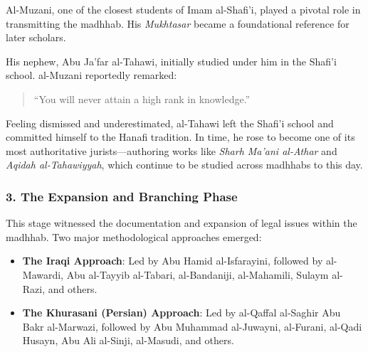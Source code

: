 \documentclass[
  a4paper,
  DIV=11,
  numbers=noendperiod]{scrartcl}
\begin{document}
\begin{tcolorbox}[enhanced jigsaw, titlerule=0mm, opacitybacktitle=0.6, toptitle=1mm, opacityback=0, left=2mm, breakable, rightrule=.15mm, arc=.35mm, colframe=quarto-callout-note-color-frame, leftrule=.75mm, colback=white, colbacktitle=quarto-callout-note-color!10!white, coltitle=black, bottomtitle=1mm, title=\textcolor{quarto-callout-note-color}{\faInfo}\hspace{0.5em}{The Legacy of al-Muzani and the Departure of al-Tahawi}, toprule=.15mm, bottomrule=.15mm]

Al-Muzani, one of the closest students of Imam al-Shafi'i, played a
pivotal role in transmitting the madhhab. His \emph{Mukhtasar} became a
foundational reference for later scholars.

His nephew, Abu Ja'far al-Tahawi, initially studied under him in the
Shafi'i school. al-Muzani reportedly remarked:

\begin{quote}
``You will never attain a high rank in knowledge.''
\end{quote}

Feeling dismissed and underestimated, al-Tahawi left the Shafi'i school
and committed himself to the Hanafi tradition. In time, he rose to
become one of its most authoritative jurists---authoring works like
\emph{Sharh Ma'ani al-Athar} and \emph{Aqidah al-Tahawiyyah}, which
continue to be studied across madhhabs to this day.

\end{tcolorbox}

\subsubsection{3. The Expansion and Branching
Phase}\label{the-expansion-and-branching-phase}

This stage witnessed the documentation and expansion of legal issues
within the madhhab. Two major methodological approaches emerged:

\begin{itemize}
\item
  \textbf{The Iraqi Approach}: Led by Abu Hamid al-Isfarayini, followed
  by al-Mawardi, Abu al-Tayyib al-Tabari, al-Bandaniji, al-Mahamili,
  Sulaym al-Razi, and others.
\item
  \textbf{The Khurasani (Persian) Approach}: Led by al-Qaffal al-Saghir
  Abu Bakr al-Marwazi, followed by Abu Muhammad al-Juwayni, al-Furani,
  al-Qadi Husayn, Abu Ali al-Sinji, al-Masudi, and others.
\end{itemize}
\end{document}
